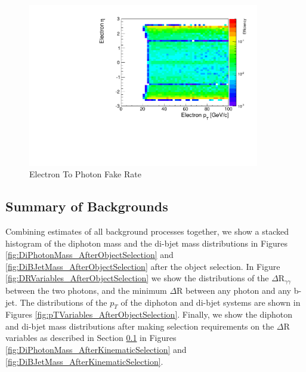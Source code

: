 \documentclass{cmspaper}
\begin{document}
\begin{figure}[h]
  \centering
  \includegraphics[width=0.9\textwidth]{figures/EfficiencyPtEta_ElectronFakesPhoton.pdf}
  \caption{Electron To Photon Fake Rate}
  \label{fig:electronToPhotonFakerate}
\end{figure}


\subsection{Summary of Backgrounds}

Combining estimates of all background processes together, we show 
a stacked histogram of the diphoton mass and the di-bjet mass distributions
in Figures \ref{fig:DiPhotonMass_AfterObjectSelection} and 
\ref{fig:DiBJetMass_AfterObjectSelection} after the object selection. In Figure 
\ref{fig:DRVariables_AfterObjectSelection} we show the distributions of the $\Delta \mathrm{R}_{\gamma\gamma}$
between the two photons, and the minimum $\Delta$R between any photon and any b-jet.
The distributions of the $p_{T}$ of the diphoton and di-bjet systems are shown in 
Figures \ref{fig:pTVariables_AfterObjectSelection}. Finally, we show the 
diphoton and di-bjet mass distributions after making selection requirements on 
the $\Delta$R variables as described in Section \ref{} in 
Figures \ref{fig:DiPhotonMass_AfterKinematicSelection}
and \ref{fig:DiBJetMass_AfterKinematicSelection}. 


\end{document}
